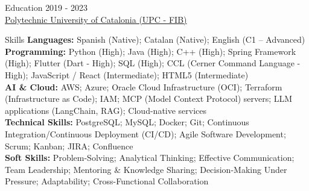 \documentclass{resume} %
\newcommand\spaceBetween{-0.3}
\newcommand\spacePoints{4}
\begin{document}
\vspace{\spaceBetween em}
\begin{rSection}{Education}
\hypersetup{hidelinks}
\href{https://www.upc.edu/en/bachelors/informatics-engineering-barcelona-fib}{} \hfill {2019 - 2023}\\
\href{https://www.fib.upc.edu/en}{Polytechnic University of Catalonia (UPC - FIB)}
\end{rSection}

\vspace{\spaceBetween em}
\begin{rSection}{Skills}
\textbf{Languages:} Spanish (Native); Catalan (Native); English (C1 – Advanced) \\[\spacePoints pt]
\textbf{Programming:} Python (High); Java (High); C++ (High); Spring Framework (High); Flutter (Dart - High); SQL (High); CCL (Cerner Command Language - High); JavaScript / React (Intermediate); HTML5 (Intermediate) \\[\spacePoints pt]
\textbf{AI \& Cloud:} AWS; Azure; Oracle Cloud Infrastructure (OCI); Terraform (Infrastructure as Code); IAM; MCP (Model Context Protocol) servers; LLM applications (LangChain, RAG); Cloud-native services \\[\spacePoints pt]
\textbf{Technical Skills:} PostgreSQL; MySQL; Docker; Git; Continuous Integration/Continuous Deployment (CI/CD); Agile Software Development; Scrum; Kanban; JIRA; Confluence \\[\spacePoints pt]
\textbf{Soft Skills:} Problem-Solving; Analytical Thinking; Effective Communication; Team Leadership; Mentoring \& Knowledge Sharing; Decision-Making Under Pressure; Adaptability; Cross-Functional Collaboration

\end{rSection}
\vspace{\spaceBetween em}
\end{document}
